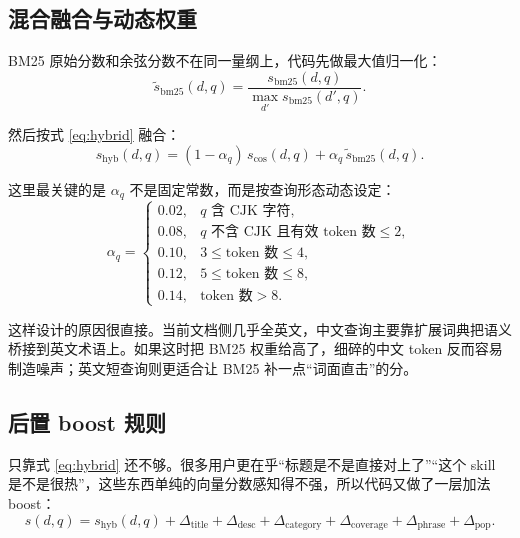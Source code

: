 \subsection{混合融合与动态权重}
BM25 原始分数和余弦分数不在同一量纲上，代码先做最大值归一化：
\begin{equation}
\label{eq:bm25-norm}
\tilde{s}_{\mathrm{bm25}}(d,q)=
\frac{s_{\mathrm{bm25}}(d,q)}{\max_{d'} s_{\mathrm{bm25}}(d',q)}.
\end{equation}

然后按式 \eqref{eq:hybrid} 融合：
\begin{equation}
\label{eq:hybrid}
s_{\mathrm{hyb}}(d,q)=
(1-\alpha_q)\,s_{\cos}(d,q)+\alpha_q\,\tilde{s}_{\mathrm{bm25}}(d,q).
\end{equation}

这里最关键的是 $\alpha_q$ 不是固定常数，而是按查询形态动态设定：
\begin{equation}
\label{eq:alpha}
\alpha_q=
\begin{cases}
0.02, & q \text{ 含 CJK 字符},\\
0.08, & q \text{ 不含 CJK 且有效 token 数}\le 2,\\
0.10, & 3\le \text{token 数}\le 4,\\
0.12, & 5\le \text{token 数}\le 8,\\
0.14, & \text{token 数}>8.
\end{cases}
\end{equation}

这样设计的原因很直接。当前文档侧几乎全英文，中文查询主要靠扩展词典把语义桥接到英文术语上。如果这时把 BM25 权重给高了，细碎的中文 token 反而容易制造噪声；英文短查询则更适合让 BM25 补一点“词面直击”的分。

\subsection{后置 boost 规则}
只靠式 \eqref{eq:hybrid} 还不够。很多用户更在乎“标题是不是直接对上了”“这个 skill 是不是很热”，这些东西单纯的向量分数感知得不强，所以代码又做了一层加法 boost：
\begin{equation}
\label{eq:boost}
s(d,q)=s_{\mathrm{hyb}}(d,q)+
\Delta_{\text{title}}+
\Delta_{\text{desc}}+
\Delta_{\text{category}}+
\Delta_{\text{coverage}}+
\Delta_{\text{phrase}}+
\Delta_{\text{pop}}.
\end{equation}

